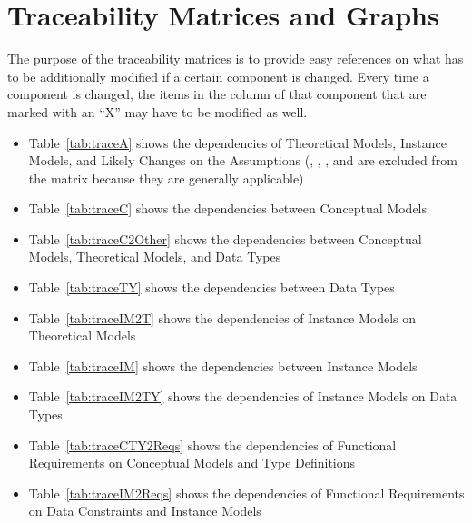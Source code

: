 \section{Traceability Matrices and Graphs}
\label{sec_trace}

The purpose of the traceability matrices is to provide easy references on what
has to be additionally modified if a certain component is changed.  Every time a
component is changed, the items in the column of that component that are marked
with an ``X'' may have to be modified as well.
\begin{itemize}
    \item Table~\ref{tab:traceA} shows the dependencies of Theoretical Models,
    Instance Models, and Likely Changes on the Assumptions
    (, , , and
     are excluded from the matrix because they are generally
    applicable)

    \item Table~\ref{tab:traceC} shows the dependencies between Conceptual
    Models

    \item Table~\ref{tab:traceC2Other} shows the dependencies between
    Conceptual Models, Theoretical Models, and Data Types

    \item Table~\ref{tab:traceTY} shows the dependencies between Data Types

    \item Table~\ref{tab:traceIM2T} shows the dependencies of Instance Models
    on Theoretical Models

    \item Table~\ref{tab:traceIM} shows the dependencies between Instance Models

    \item Table~\ref{tab:traceIM2TY} shows the dependencies of Instance Models
    on Data Types

    \item Table~\ref{tab:traceCTY2Reqs} shows the dependencies of Functional
    Requirements on Conceptual Models and Type Definitions

    \item Table~\ref{tab:traceIM2Reqs} shows the dependencies of Functional
    Requirements on Data Constraints and Instance Models

\end{itemize}

